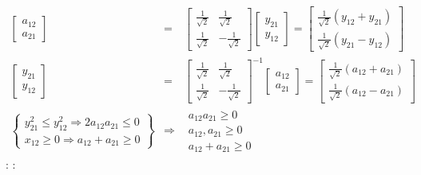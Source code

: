 \documentclass{article}
\begin{document}
\begin{eqnarray*}
\left[ 
\begin{array}{c}
a_{12} \\ 
a_{21}%
\end{array}%
\right]  &=&\left[ 
\begin{array}{cc}
\frac{1}{\sqrt{2}} & \frac{1}{\sqrt{2}} \\ 
\frac{1}{\sqrt{2}} & -\frac{1}{\sqrt{2}}%
\end{array}%
\right] \left[ 
\begin{array}{c}
y_{21} \\ 
y_{12}%
\end{array}%
\right] =\left[ 
\begin{array}{c}
\frac{1}{\sqrt{2}}\left( y_{12}+y_{21}\right)  \\ 
\frac{1}{\sqrt{2}}\left( y_{21}-y_{12}\right) 
\end{array}%
\right]  \\
\left[ 
\begin{array}{c}
y_{21} \\ 
y_{12}%
\end{array}%
\right]  &=&\left[ 
\begin{array}{cc}
\frac{1}{\sqrt{2}} & \frac{1}{\sqrt{2}} \\ 
\frac{1}{\sqrt{2}} & -\frac{1}{\sqrt{2}}%
\end{array}%
\right] ^{-1}\left[ 
\begin{array}{c}
a_{12} \\ 
a_{21}%
\end{array}%
\right] =\left[ 
\begin{array}{c}
\frac{1}{\sqrt{2}}\left( a_{12}+a_{21}\right)  \\ 
\frac{1}{\sqrt{2}}\left( a_{12}-a_{21}\right) 
\end{array}%
\right]  \\
\left\{ 
\begin{array}{c}
y_{21}^{2}\leq y_{12}^{2}\Longrightarrow 2a_{12}a_{21}\leq 0 \\ 
x_{12}\geq 0\Longrightarrow a_{12}+a_{21}\geq 0%
\end{array}%
\right\}  &\Longrightarrow &%
\begin{array}{c}
a_{12}a_{21}\geq 0 \\ 
a_{12},a_{21}\geq 0 \\ 
a_{12}+a_{21}\geq 0%
\end{array}%
\end{eqnarray*}
:  : 
\end{document}
